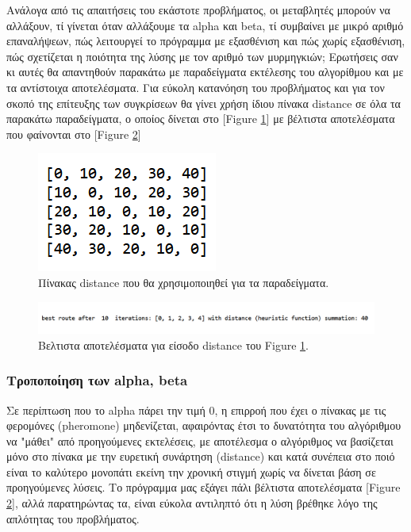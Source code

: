 Ανάλογα από τις απαιτήσεις του εκάστοτε προβλήματος, οι μεταβλητές μπορούν να αλλάξουν, τί γίνεται όταν αλλάξουμε τα alpha και beta, τί συμβαίνει με μικρό αριθμό επαναλήψεων, πώς λειτουργεί το πρόγραμμα με εξασθένιση και πώς χωρίς εξασθένιση, πώς σχετίζεται η ποιότητα της λύσης με τον αριθμό των μυρμηγκιών; Ερωτήσεις σαν κι αυτές θα απαντηθούν παρακάτω με παραδείγματα εκτέλεσης του αλγορίθμου και με τα αντίστοιχα αποτελέσματα. 
Για εύκολη κατανόηση του προβλήματος και για τον σκοπό της επίτευξης των συγκρίσεων θα γίνει χρήση ίδιου πίνακα distance σε όλα τα παρακάτω παραδείγματα, ο οποίος δίνεται στο [Figure \ref{13}] με βέλτιστα αποτελέσματα που φαίνονται στο [Figure \ref{14}]
\begin{figure}
    \centering
    \includegraphics[scale=1]{2947_thesis/pictures/distance.png} 
    \caption{Πίνακας distance που θα χρησιμοποιηθεί για τα παραδείγματα.}
    \label{13}
\end{figure}
\begin{figure}
    \centering
    \includegraphics[scale=0.55]{2947_thesis/pictures/ex2.png} 
    \caption{Βελτιστα αποτελέσματα για είσοδο distance του Figure \ref{13}.}
    \label{14}
\end{figure}

\subsubsection{Τροποποίηση των alpha, beta}

Σε περίπτωση που το alpha πάρει την τιμή 0, η επιρροή που έχει ο πίνακας με τις φερομόνες (pheromone) μηδενίζεται, αφαιρόντας έτσι το δυνατότητα του αλγόριθμου να "μάθει" από προηγούμενες εκτελέσεις, με αποτέλεσμα ο αλγόριθμος να βασίζεται μόνο στο πίνακα με την ευρετική συνάρτηση (distance) και κατά συνέπεια στο ποιό είναι το καλύτερο μονοπάτι εκείνη την χρονική στιγμή χωρίς να δίνεται βάση σε προηγούμενες λύσεις. Το πρόγραμμα μας εξάγει πάλι βέλτιστα αποτελέσματα [Figure \ref{14}], αλλά παρατηρώντας τα, είναι εύκολα αντιληπτό ότι η λύση βρέθηκε λόγο της απλότητας του προβλήματος. 

